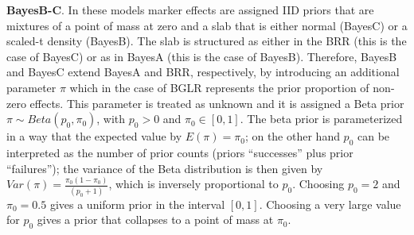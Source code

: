 \documentclass[article,shortnames,nojss]{jss}
\begin{document}
\textbf{BayesB-C}. In these models marker effects are 
assigned IID priors that are mixtures of a point of 
mass at zero and a slab that is either normal 
(BayesC) or a scaled-t density (BayesB). The slab is 
structured as either in the BRR (this is the case of BayesC) 
or as in BayesA (this is the case of BayesB). Therefore, 
BayesB and BayesC extend BayesA and BRR, respectively, 
by introducing an additional parameter $\pi$ which in the case 
of BGLR represents the prior proportion of 
non-zero effects. This parameter is treated as unknown 
and it is assigned a Beta prior $\pi\sim Beta(p_0, \pi_0)$, with 
$p_0>0$ and $\pi_0 \in [0,1]$. The beta prior is 
parameterized in a way that the expected value by $E(\pi)=\pi_0$;
on the other hand $p_0$ can be interpreted as the number 
of prior counts (priors ``successes'' plus prior ``failures''); the 
variance of the Beta distribution is then given by 
$Var(\pi)=\frac{\pi_0(1-\pi_0)}{(p_0+1)}$, which is inversely 
proportional to $p_0$. Choosing $p_0=2$ and $\pi_0=0.5$ gives 
a uniform prior in the interval $[0,1]$. Choosing a very 
large value for $p_0$ gives a prior that 
collapses to a point of mass at $\pi_0$.
\end{document}
